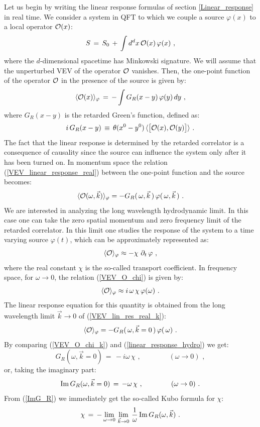 \documentclass[12pt,notitlepage]{article}
\newcommand{\beq}{\begin{equation}}
\newcommand{\eeq}{\end{equation}}
\begin{document}
Let us  begin by writing the linear response formulas of section \ref{Linear_response} in real time. We consider a system in QFT to which we couple a source $\varphi(x)$ to a local operator ${\cal O}(x)$:
\beq
S\,=\,S_0\,+\,\int d^dx \,{\cal O}(x)\,\varphi(x)\,\,,
\eeq
where the $d$-dimensional spacetime has Minkowski signature.  We will assume that the unperturbed VEV of the operator ${\cal O}$ vanishes. Then, the one-point function of the operator ${\cal O}$ in the presence of the source is given by:
\beq
\langle {\cal O} (x)\rangle_{\varphi} \,=\,-\int G_{R} (x-y)\,\varphi(y)\,dy\,\,,
\label{VEV_linear_response_real}
\eeq
where $G_{R} (x-y)$ is the retarded Green's function, defined as:
\beq
i\,G_{R} (x-y)\,\equiv\,\theta(x^0-y^0)\,\langle \big[
{\cal O}(x), {\cal O}(y)\big]\rangle\,\,.
\eeq
The fact that the  linear response is determined by the retarded correlator is a consequence of causality since  the source can influence the system only after it has been turned on. In momentum space the relation (\ref{VEV_linear_response_real}) between  the one-point function and the source becomes:
\beq
\langle {\cal O} (\omega, \vec k)\rangle_{\varphi} =
-G_R(\,\omega, \vec k\,) \,\varphi (\,\omega, \vec k\,) \,\,.
\label{VEV_lin_res_real_k}
\eeq
We are interested in analyzing the long wavelength hydrodynamic limit. In this case one can take the zero spatial momentum and zero frequency limit of the retarded correlator. 
In this limit one studies the response of the system to a time varying source $\varphi(t)$, which can be approximately represented as:
\beq
\langle {\cal O} \rangle_{\varphi} \approx -\chi\,\, \partial_t\,\varphi\,\,,
\label{VEV_O_chi}
\eeq
where  the real constant $\chi$ is the so-called transport coefficient. In frequency space, for $\omega\to 0$,  the relation  (\ref{VEV_O_chi}) is given by:
\beq
\langle {\cal O} \rangle_{\varphi} \approx  i \,\omega\, \chi\,\varphi (\omega)\,\,.
\label{VEV_O_chi_k}
\eeq
The linear response equation for this quantity is obtained from the long wavelength limit $\vec k\to 0$ of (\ref{VEV_lin_res_real_k}):
\beq
\langle {\cal O}\rangle_{\varphi} =
-G_R(\,\omega, \vec k =0\,) \,\varphi (\,\omega)\,\,.
\label{linear_response_hydro}
\eeq
By comparing (\ref{VEV_O_chi_k}) and (\ref{linear_response_hydro}) we get:
\beq
G_R(\omega, \vec k=0)\,=\,-i\omega\,\chi\,\,,
\qquad\qquad (\omega\to 0)\,\,,
\eeq
or, taking the imaginary part:
\beq
{\rm Im}\, G_R(\omega, \vec k=0)\,=\,-\omega\,\chi\,\,,
\qquad\qquad (\omega\to 0)\,\,.
\label{ImG_R}
\eeq
From (\ref{ImG_R}) we immediately get the so-called  Kubo formula for $\chi$:
\beq
\chi\,=\,-\lim_{\omega\to 0}\,\lim_{\vec k\to 0}\, {1\over \omega}\,
{\rm Im}\, G_R(\omega, \vec k)\,\,.
\label{Kubo}
\eeq
\end{document}
